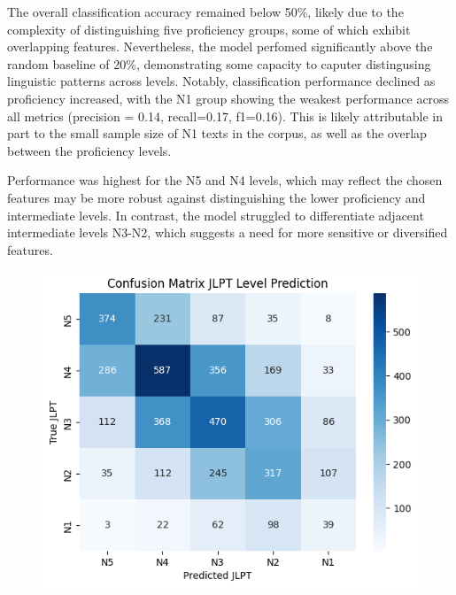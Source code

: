 The overall classification accuracy remained below 50\%, likely due to the complexity of distinguishing five
proficiency groups, some of which exhibit overlapping features. Nevertheless, the model perfomed significantly above
the random baseline of 20\%, demonstrating some capacity to caputer distingusing linguistic patterns across levels.
Notably, classification performance declined as proficiency increased, with the N1 group showing the weakest
performance across all metrics (precision = 0.14, recall=0.17, f1=0.16). This is likely attributable in part to the
small sample size of N1 texts in the corpus, as well as the overlap between the proficiency levels.

Performance was highest for the N5 and N4 levels, which may reflect the chosen features may be more robust against
distinguishing the lower proficiency and intermediate levels. In contrast, the model struggled to differentiate
adjacent intermediate levels N3-N2, which suggests a need for more sensitive or diversified features.

\begin{figure}[h!]
           \centering
           \includegraphics[scale=.4]{img/confusionMatrix}
           \caption[Confusion Matrix]{}
           \label{fig:conMA}
\end{figure}


